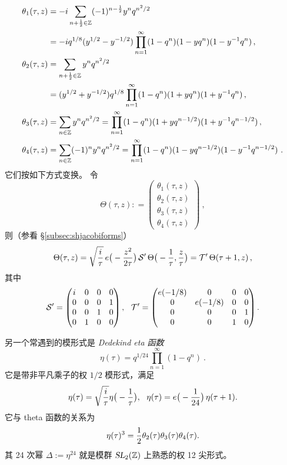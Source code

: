 \documentclass[11pt,a4paper,fontset=windows]{ctexart}
\numberwithin{equation}{section}
\newcommand{\SL}{\operatorname{\textsl{SL}}}      %
\newcommand{\ZZ}{\mathbb{Z}}
\newcommand{\Z}{\mathbb{Z}}
\def\t{\tau}
\def\th{\theta}
\newcommand{\ex}{\operatorname{e}} %
\newcommand{\be}{\begin{equation}}
\newcommand{\ee}{\end{equation}}
\newcommand{\bem}{\begin{pmatrix}}
\newcommand{\eem}{\end{pmatrix}}
\begin{document}
\begin{equation}
\begin{split}
\theta_1(\tau,z) & = -i \sum_{n+{1\over 2}\in \Z} (-1)^{n-{1\over 2}} y^n q^{n^2/2} \\
&=-iq^{1/8} (y^{1/2}-y^{-1/2})\prod_{n=1}^\infty (1-q^n)(1-yq^{n})(1-y^{-1}q^{n})\, ,\\
\theta_2(\tau,z) & = \sum_{n+{1\over 2}\in \Z} y^n q^{n^2/2} \\
&=(y^{1/2}+y^{-1/2})q^{1/8} \prod_{n=1}^\infty (1-q^n)(1+yq^{n})(1+y^{-1}q^{n}) \, ,\\
 \theta_3(\tau,z)  &= \sum_{n\in \Z} y^n q^{n^2/2} = \prod_{n=1}^\infty (1-q^n)(1+yq^{n-1/2})(1+y^{-1}q^{n-1/2})\, , \\
\theta_4(\tau,z) 
&= \sum_{n\in \Z} (-1)^n y^n q^{n^2/2} = \prod_{n=1}^\infty (1-q^n)(1-yq^{n-1/2})(1-y^{-1}q^{n-1/2})~.
\end{split}
\end{equation}
它们按如下方式变换。
令
\be
\Theta(\t,z): = \bem  \theta_1(\tau,z) \\ \theta_2(\tau,z) \\ \theta_3(\tau,z) \\ \theta_4(\tau,z) \eem~, 
\ee
则（参看 \S\ref{subsec:shjacobiforms}）
\be
\Theta(\t,z) =  \sqrt{i\over \t} \, e\big(-\frac{z^2}{2\t}\big) \, {\cal S}'\,   \Theta\big(-{1\over \t},{z\over\t}\big)  ={\cal T}' \,\Theta(\t+1,z)\, ,
\ee
其中
\be
{\cal S}' = \bem  i &0&0&0\\ 0&0&0&1\\ 0&0&1&0 \\ 0&1&0&0 \eem, ~~ {\cal T}' = \bem  e({-1/8})&0&0&0\\0& e({-1/8})&0&0\\  0&0&0&1 \\ 0& 0&1&0 \eem . 
\ee


另一个常遇到的模形式是 \emph{Dedekind eta 函数}
\be\label{def:dedeta}
\eta(\t) = q^{1/24} \prod_{n=1}^\infty (1-q^n)~.
\ee
它是带非平凡乘子的权 $1/2$ 模形式，满足
\be\label{eta_multiplier}
\eta(\t) = \sqrt{i\over \t} \eta\big(-{1\over\t}\big),~~ \eta(\t) = e\big(-{1\over 24}\big) \,\eta(\t+1). 
\ee
它与 theta 函数的关系为
\be
\eta(\t)^3 = {1\over 2}\th_2(\t)\th_3(\t)\th_4(\t).
\ee
其 24 次幂 $\Delta:=\eta^{24}$ 就是模群 $\SL_2(\ZZ)$ 上熟悉的权 12 尖形式。
\end{document}

